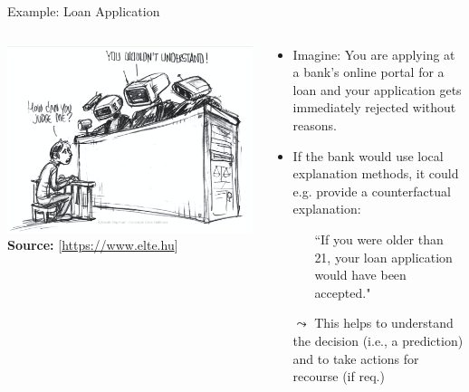 \documentclass[11pt,compress,t,notes=noshow, aspectratio=169, xcolor=table]{beamer}
\begin{document}
\begin{vbframe}{Example: Loan Application}

\begin{columns}
    
    \begin{column}{0.5\textwidth}
        	\begin{center}
		\includegraphics[width=1\textwidth]{figure/IntroJudge.png}\\
		{\textbf{Source:} [\href{https://www.elte.hu/content/trendfordulo-az-mi-fejlesztesekben.t.19025}{https://www.elte.hu}]}
	\end{center}
	
	\end{column}
	
	\begin{column}{0.5\textwidth}
	
    	\begin{itemize}
    	    \item Imagine: You are applying at a bank's online portal for a loan and your application gets immediately rejected without reasons.
    	    \item If the bank would use local explanation methods, it could e.g. provide a counterfactual explanation:
    	    \begin{itemize}
    	        \item[] ``If you were older than 21, your loan application would have been accepted."
    	    \end{itemize}
    	    \item[$\leadsto$] This helps to understand the decision (i.e., a prediction) and to take actions for recourse (if req.)
    	\end{itemize}
    	
    \end{column}
\end{columns}

\end{vbframe}
\end{document}
